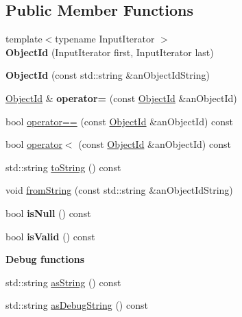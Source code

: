\subsection*{Public Member Functions}
\begin{DoxyCompactItemize}
\item 
{\footnotesize template$<$typename Input\+Iterator $>$ }\\{\bfseries Object\+Id} (Input\+Iterator first, Input\+Iterator last)\hypertarget{class_base_1_1_object_id_a96f9abac9baddbf62eaad80bd1499e72}{}\label{class_base_1_1_object_id_a96f9abac9baddbf62eaad80bd1499e72}

\item 
{\bfseries Object\+Id} (const std\+::string \&an\+Object\+Id\+String)\hypertarget{class_base_1_1_object_id_aca3e55b04c30d9f939f04b2de5aa25c5}{}\label{class_base_1_1_object_id_aca3e55b04c30d9f939f04b2de5aa25c5}

\item 
\hyperlink{class_base_1_1_object_id}{Object\+Id} \& {\bfseries operator=} (const \hyperlink{class_base_1_1_object_id}{Object\+Id} \&an\+Object\+Id)\hypertarget{class_base_1_1_object_id_a449f58cf08f6684639023708b882a00e}{}\label{class_base_1_1_object_id_a449f58cf08f6684639023708b882a00e}

\item 
bool \hyperlink{class_base_1_1_object_id_abe7eb5f3190496d40e1f364b6145e4b2}{operator==} (const \hyperlink{class_base_1_1_object_id}{Object\+Id} \&an\+Object\+Id) const 
\item 
bool \hyperlink{class_base_1_1_object_id_ad69ac55dac3aafd3ea38281ae7d762c0}{operator$<$} (const \hyperlink{class_base_1_1_object_id}{Object\+Id} \&an\+Object\+Id) const 
\item 
std\+::string \hyperlink{class_base_1_1_object_id_af3e9b3d04e1628fa6c1973920fabcd14}{to\+String} () const 
\item 
void \hyperlink{class_base_1_1_object_id_ae32c9ac9ee69665fed2771854da880b6}{from\+String} (const std\+::string \&an\+Object\+Id\+String)
\item 
bool {\bfseries is\+Null} () const \hypertarget{class_base_1_1_object_id_a113567944442dcaebfbb8abe2e8952fb}{}\label{class_base_1_1_object_id_a113567944442dcaebfbb8abe2e8952fb}

\item 
bool {\bfseries is\+Valid} () const \hypertarget{class_base_1_1_object_id_a7b5254288f7bf70ed7a6268abc3b930b}{}\label{class_base_1_1_object_id_a7b5254288f7bf70ed7a6268abc3b930b}

\end{DoxyCompactItemize}
\begin{Indent}{\bf Debug functions}\par
\begin{DoxyCompactItemize}
\item 
std\+::string \hyperlink{class_base_1_1_object_id_afdc5a733d73342473fec933503e49a6e}{as\+String} () const 
\item 
std\+::string \hyperlink{class_base_1_1_object_id_a38e6fd78d084461a0535bd86b998db56}{as\+Debug\+String} () const 
\end{DoxyCompactItemize}
\end{Indent}
